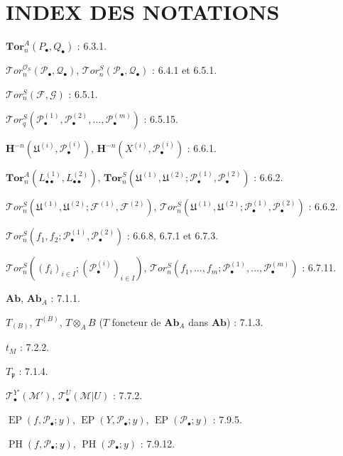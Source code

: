 \section*{INDEX DES NOTATIONS}

\begin{flushleft}
$\mathbf{Tor}_n^A(P_\bullet,Q_\bullet)$ : 6.3.1.

\medskip
$\mathscr{T}\!or_n^{\mathscr O_S}(\mathscr P_\bullet,\mathscr Q_\bullet)$,
$\mathscr{T}\!or_n^S(\mathscr P_\bullet,\mathscr Q_\bullet)$ : 6.4.1 et 6.5.1.

\medskip
$\mathscr{T}\!or_n^S(\mathscr F,\mathscr G)$ : 6.5.1.

\medskip
$\mathscr{T}\!or_q^S(\mathscr P_\bullet^{(1)},\mathscr P_\bullet^{(2)},\ldots,
\mathscr P_\bullet^{(m)})$ : 6.5.15.

\medskip
$\mathbf H^{-n}(\mathfrak U^{(i)},\mathscr P_\bullet^{(i)})$,
$\mathbf H^{-n}(X^{(i)},\mathscr P_\bullet^{(i)})$ : 6.6.1.

\medskip
$\mathbf{Tor}_n^A(L_{\bullet\bullet}^{(1)},L_{\bullet\bullet}^{(2)})$,
$\mathbf{Tor}_n^S(\mathfrak U^{(1)},\mathfrak U^{(2)};
\mathscr P_\bullet^{(1)},\mathscr P_\bullet^{(2)})$ : 6.6.2.

\medskip
$\mathscr{T}\!or_n^S(\mathfrak U^{(1)},\mathfrak U^{(2)};
\mathscr F^{(1)},\mathscr F^{(2)})$,
$\mathscr{T}\!or_n^S(\mathfrak U^{(1)},\mathfrak U^{(2)};
\mathscr P_\bullet^{(1)},\mathscr P_\bullet^{(2)})$ : 6.6.2.

\medskip
$\mathscr{T}\!or_n^S(f_1,f_2;\mathscr P_\bullet^{(1)},
\mathscr P_\bullet^{(2)})$ : 6.6.8, 6.7.1 et 6.7.3.

\medskip
$\mathscr{T}\!or_n^S((f_i)_{i\in I};(\mathscr P_\bullet^{(i)})_{i\in I})$,
$\mathscr{T}\!or_n^S(f_1,\ldots,f_m;\mathscr P_\bullet^{(1)},\ldots,
\mathscr P_\bullet^{(m)})$ : 6.7.11.

\medskip
$\mathbf{Ab}$, $\mathbf{Ab}_A$ : 7.1.1.

\medskip
$T_{(B)}$, $T^{(B)}$, $T\otimes_A B$
($T$ foncteur de $\mathbf{Ab}_A$ dans $\mathbf{Ab}$) : 7.1.3.

\medskip
$t_M$ : 7.2.2.

\medskip
$T_{\mathfrak p}$ : 7.1.4.

\medskip
$\mathscr T_\bullet^{Y'}(\mathscr M')$,
$\mathscr T_\bullet^U(\mathscr M|U)$ : 7.7.2.

\medskip
$\operatorname{EP}(f,\mathscr P_\bullet;y)$,
$\operatorname{EP}(Y,\mathscr P_\bullet;y)$,
$\operatorname{EP}(\mathscr P_\bullet;y)$ : 7.9.5.

\medskip
$\operatorname{PH}(f,\mathscr P_\bullet;y)$,
$\operatorname{PH}(\mathscr P_\bullet;y)$ : 7.9.12.
\end{flushleft}

\clearpage
